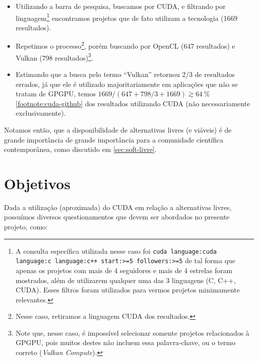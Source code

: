 \documentclass[10pt, a4paper, conference, onecolumn]{IEEEtran}
\begin{document}
\begin{itemize}
    \item Utilizando a barra de pesquisa, buscamos por CUDA, e filtrando por
        linguagem\footnote{
            A consulta específica utilizada nesse caso foi
            \verb|cuda language:cuda language:c language:c++ start:>=5 followers:>=5|
            de tal forma que apenas os projetos com mais de 4 seguidores e mais
            de 4 estrelas foram mostrados, além de utilizarem qualquer uma das
            3 linguagens (C, C++, CUDA). Esses filtros foram utilizados para
            vermos projetos minimamente relevantes.}
        encontramos projetos que de fato utilizam a tecnologia
        (1669 resultados).
    \item Repetimos o processo\footnote{
        Nesse caso, retiramos a linguagem CUDA dos resultados.
    }, porém buscando por OpenCL (647 resultados) e Vulkan (798
        resultados)\footnote{
            Note que, nesse caso, é impossível selecionar somente projetos
            relacionados à GPGPU, pois muitos destes não incluem essa
            palavra-chave, ou o termo correto (\textit{Vulkan Compute}).
        }.
    \item Estimando que a busca pelo termo ``Vulkan'' retornou 2/3 de
        resultados errados, já que ele é utilizado majoritariamente em
        aplicações que não se tratam de GPGPU, temos $ 1669 / (647 + 798/3 +
        1669) \gtrsim \qty{64}{\percent} $\cref{footnote:cuda-github} dos
        resultados utilizando CUDA (não necessariamente exclusivamente).
\end{itemize}

Notamos então, que a disponibilidade de alternativas livres (e viáveis) é de
grande importância de grande importância para a comunidade científica
contemporânea, como discutido em \cref{sec:soft-livre}.


\section{Objetivos} \label{sec:objetivos}

Dada a utilização (aproximada) do CUDA em relação a alternativas livres,
possuímos diversos questionamentos que devem ser abordados no presente projeto,
como:
\end{document}
